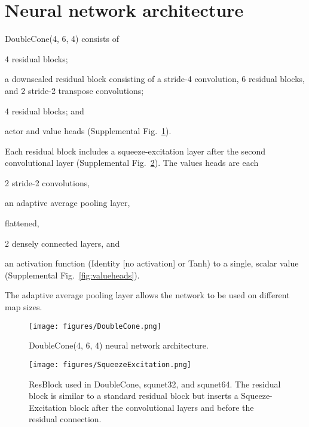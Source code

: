 \documentclass[conference]{IEEEtran}
\newcounter{suppfigure}
\newenvironment{suppfigure}
  {\renewcommand{\figurename}{Supplemental Fig.}\setcounter{figure}{\value{suppfigure}}\addtocounter{suppfigure}{1}\begin{figure}}
  {\end{figure}\setcounter{suppfigure}{\value{figure}}}
\begin{document}
\section{Neural network architecture}
DoubleCone(4, 6, 4) \cite{Ferdinand2021doublecone} consists of
\begin{inparaenum}[(1)]
    \item 4 residual blocks;
    \item a downscaled residual block consisting of a stride-4 convolution, 6 residual blocks, and
        2 stride-2 transpose convolutions;
    \item 4 residual blocks; and
    \item actor and value heads (Supplemental Fig.~\ref{suppfig:doublecone}).
\end{inparaenum}
Each residual block includes a squeeze-excitation layer after the second convolutional
layer (Supplemental Fig.~\ref{fig:squeezeexcitation}). The values heads are each 
\begin{inparaenum}[(1)]
    \item 2 stride-2 convolutions,
    \item an adaptive average pooling layer,
    \item flattened,
    \item 2 densely connected layers, and
    \item an activation function (Identity [no activation] or Tanh) to a single, scalar
    value (Supplemental Fig.~\ref{fig:valueheads}).
\end{inparaenum}
The adaptive average pooling layer allows the network to be used on different map sizes.

\begin{suppfigure}[H]
    \begin{center}
        \texttt{[image: figures/DoubleCone.png]}
    \end{center}
    \caption{DoubleCone(4, 6, 4) neural network architecture.}
    \label{suppfig:doublecone}
\end{suppfigure}

\begin{suppfigure}[H]
    \begin{center}
        \texttt{[image: figures/SqueezeExcitation.png]}
    \end{center}
    \caption{ResBlock used in DoubleCone, squnet32, and squnet64. The residual block is similar to a standard residual block but inserts a Squeeze-Excitation block after the convolutional layers and before the residual connection.}
    \label{fig:squeezeexcitation}
\end{suppfigure}
\end{document}
